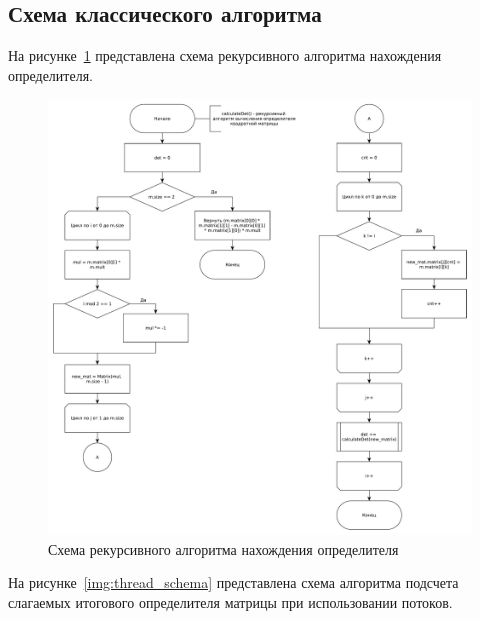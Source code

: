 \documentclass[12pt]{report}
\begin{document}
    \subsection{Схема классического алгоритма}
    На рисунке~\ref{img:count_det} представлена схема рекурсивного алгоритма нахождения определителя.

    \begin{figure}[H]
        \centering
        \includegraphics[width=1\linewidth]{img/count_det}
        \caption{
            Схема рекурсивного алгоритма нахождения определителя
        }
        \label{img:count_det}
    \end{figure}

    На рисунке~\ref{img:thread_schema} представлена схема алгоритма подсчета слагаемых итогового определителя матрицы
    при использовании потоков.
\end{document}
